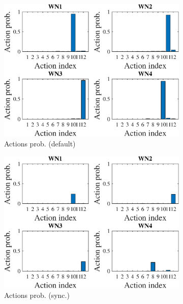 \documentclass[preprint,12pt]{article}
\begin{document}
\begin{figure}[h!]
	\centering
	\begin{subfigure}[b]{.3\textwidth}
		\includegraphics[width=\textwidth]{images/actions_probability_TS}
		\caption{Actions prob. (default)}\label{fig:hist_actions_TS}
	\end{subfigure}
	\begin{subfigure}[b]{.3\textwidth}
		\includegraphics[width=\textwidth]{images/actions_probability_CTS}
		\caption{Actions prob. (sync.)}\label{fig:hist_actions_CTS}
	\end{subfigure}\\
	\begin{subfigure}[b]{.3\textwidth}

\end{subfigure}
\end{figure}
\end{document}
